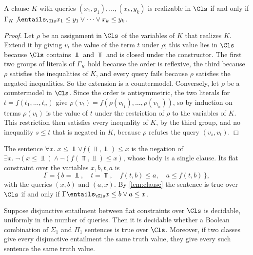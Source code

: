 \begin{lemma}[Clauses]\label{lem:clause}
A clause $K$ with queries $(x_1,y_1),\dots,(x_k,y_k)$ is realizable in $\Cls$
if and only if $\Gamma_K\not\entails_{\Cls}x_1\le y_1\vee\dots\vee x_k\le
y_k$.
\end{lemma}

\begin{proof}
Let $\rho$ be an assignment in $\Cls$ of the variables of $K$ that realizes
$K$. Extend it by giving $v_t$ the value of the term $t$ under $\rho$; this
value lies in $\Cls$ because $\Cls$ contains $\Bot$ and $\Top$ and is closed
under the constructor. The first two groups of literals of $\Gamma_K$ hold
because the order is reflexive, the third because $\rho$ satisfies the
inequalities of $K$, and every query fails because $\rho$ satisfies the
negated inequalities. So the extension is a countermodel. Conversely, let
$\rho$ be a countermodel in $\Cls$. Since the order is antisymmetric, the two
literals for $t=f(t_1,\dots,t_n)$ give
$\rho(v_t)=f(\rho(v_{t_1}),\dots,\rho(v_{t_n}))$, so by induction on terms
$\rho(v_t)$ is the value of $t$ under the restriction of $\rho$ to the
variables of $K$. This restriction then satisfies every inequality of $K$,
by the third group, and no inequality $s\le t$ that is negated in $K$,
because $\rho$ refutes the query $(v_s,v_t)$.
\end{proof}

\begin{example}\label{ex:clause}
The sentence $\forall x.\;x\le\Bot\vee f(\Top,\Bot)\le x$ is the negation of
$\exists x.\;\neg(x\le\Bot)\wedge\neg(f(\Top,\Bot)\le x)$, whose body is a
single clause. Its flat constraint over the variables $x,b,t,a$ is
\[
  \Gamma=\{\,b=\Bot,\quad t=\Top,\quad f(t,b)\le a,\quad a\le f(t,b)\,\},
\]
with the queries $(x,b)$ and $(a,x)$. By \cref{lem:clause} the sentence is
true over $\Cls$ if and only if $\Gamma\entails_{\Cls}x\le b\vee a\le x$.
\end{example}

\begin{proposition}\label{prop:sentences}
Suppose disjunctive entailment between flat constraints over $\Cls$ is
decidable, uniformly in the number of queries. Then it is decidable whether a
Boolean combination of $\Sigma_1$ and $\Pi_1$ sentences is true over $\Cls$.
Moreover, if two classes give every disjunctive entailment the same truth
value, they give every such sentence the same truth value.
\end{proposition}

